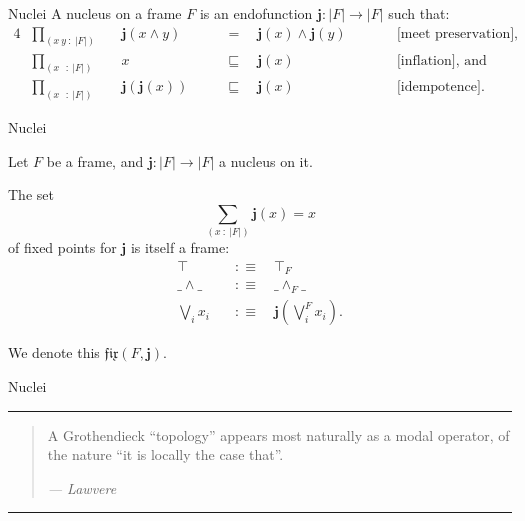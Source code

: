 \documentclass[xcolor={dvipsnames}]{beamer}
\newcommand{\pity}[3]{\prod_{(#1~:~#2)} #3}
\newcommand{\sigmaty}[3]{\sum_{(#1~:~#2)} #3}
\newcommand{\abs}[1]{\left| #1 \right|}
\newcommand{\nuclnm}{\mathbf{j}}
\newcommand{\nuclapp}[1]{\nuclnm{}\left(#1\right)}
\newcommand{\fix}[2]{\mathfrak{fix}\left(#1, #2\right)}
\newcommand{\is}{:\equiv}
\begin{document}
\begin{frame}{Nuclei}
  \large
  A \alert{nucleus} on a frame $F$ is an endofunction $\nuclnm : \abs{F} \rightarrow \abs{F}$ such
  that:
  \begin{alignat*}{4}
    &\pity{x~y}{\abs{F}}{~&& \nuclapp{x \wedge y}       \quad&&=\quad \nuclapp{x} \wedge \nuclapp{y}}
      &&\qquad\text{[meet preservation],}\\
    &\pity{x~~}{\abs{F}}{~&& x                     \quad&&\sqsubseteq\quad \nuclapp{x}}
      &&\qquad\text{[inflation], and}\\
    &\pity{x~~}{\abs{F}}{~&& \nuclapp{\nuclapp{x}} \quad&&\sqsubseteq\quad \nuclapp{x}}
      &&\qquad\text{[idempotence].}
  \end{alignat*}

  \vspace{0.5em}

\end{frame}

\begin{frame}{Nuclei}
  \large

  Let $F$ be a frame, and $\nuclnm{} : \abs{F} \rightarrow \abs{F}$ a nucleus on it.

  \vspace{1em}

  The set
  \begin{equation*}
    \sigmaty{x}{\abs{F}}{\nuclapp{x} = x}
  \end{equation*}
  of \alert{fixed points} for $\nuclnm{}$ is itself a frame:
  \begin{align*}
    \top       \quad&\is\quad \top_F                \\
    \_\wedge\_   \quad&\is\quad \_\wedge_F\_            \\
    \bigvee_i x_i \quad&\is\quad \nuclapp{\bigvee^F_i x_i} .
  \end{align*}

  We denote this $\fix{F}{\nuclnm{}}$.
\end{frame}

\begin{frame}{Nuclei}
  \large

  \hrule
  \begin{quote}
    A Grothendieck ``topology'' appears most naturally as a modal operator, of the nature
    ``it is locally the case that''.
    \begin{flushright}
      \emph{--- Lawvere~\cite{quantifiers-and-sheaves}}
    \end{flushright}
  \end{quote}
  \hrule

  \vspace{1.5em}

\end{frame}
\end{document}
